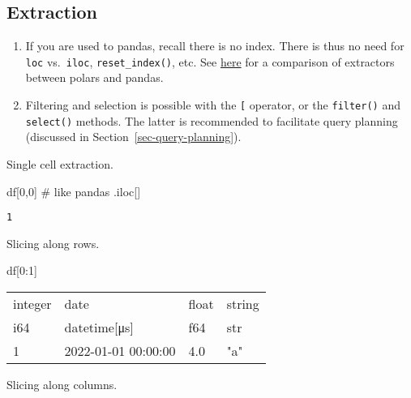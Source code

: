 \documentclass[
  letterpaper,
  DIV=11,
  numbers=noendperiod]{scrartcl}
\newenvironment{Shaded}{\begin{snugshade}}{\end{snugshade}}
\newcommand{\CommentTok}[1]{\textcolor[rgb]{0.37,0.37,0.37}{#1}}
\newcommand{\DecValTok}[1]{\textcolor[rgb]{0.68,0.00,0.00}{#1}}
\newcommand{\NormalTok}[1]{\textcolor[rgb]{0.00,0.23,0.31}{#1}}
\providecommand{\tightlist}{%
  \setlength{\itemsep}{0pt}\setlength{\parskip}{0pt}}\usepackage{longtable,booktabs,array}
\begin{document}
\hypertarget{extraction}{%
\subsection{Extraction}\label{extraction}}

\begin{enumerate}
\def\labelenumi{\arabic{enumi}.}
\tightlist
\item
  If you are used to pandas, recall there is no index. There is thus no
  need for \texttt{loc} vs.~\texttt{iloc}, \texttt{reset\_index()}, etc.
  See
  \href{https://pola-rs.github.io/polars-book/user-guide/howcani/selecting_data/selecting_data_indexing.html}{here}
  for a comparison of extractors between polars and pandas.
\item
  Filtering and selection is possible with the \texttt{{[}} operator, or
  the \texttt{filter()} and \texttt{select()} methods. The latter is
  recommended to facilitate query planning (discussed in
  Section~\ref{sec-query-planning}).
\end{enumerate}

Single cell extraction.

\begin{Shaded}
\begin{Highlighting}[]
\NormalTok{df[}\DecValTok{0}\NormalTok{,}\DecValTok{0}\NormalTok{] }\CommentTok{\# like pandas .iloc[]}
\end{Highlighting}
\end{Shaded}

\begin{verbatim}
1
\end{verbatim}

Slicing along rows.

\begin{Shaded}
\begin{Highlighting}[]
\NormalTok{df[}\DecValTok{0}\NormalTok{:}\DecValTok{1}\NormalTok{] }
\end{Highlighting}
\end{Shaded}

\begin{longtable}[]{@{}llll@{}}
\toprule()
integer & date & float & string \\
i64 & datetime{[}μs{]} & f64 & str \\
\midrule()
\endhead
1 & 2022-01-01 00:00:00 & 4.0 & "a" \\
\bottomrule()
\end{longtable}

Slicing along columns.
\end{document}
